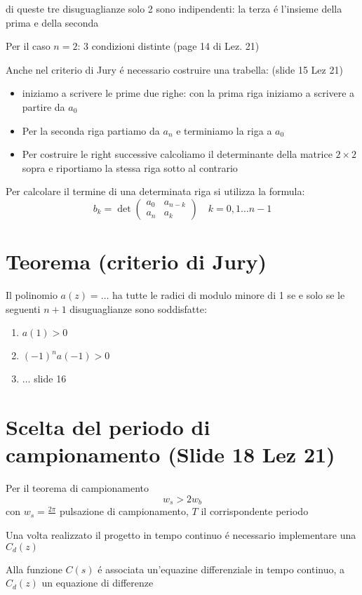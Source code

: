 \documentclass{article}
\begin{document}
di queste tre disuguaglianze solo 2 sono indipendenti: la terza \'e l'insieme della prima e della seconda

Per il caso $n = 2$: 3 condizioni distinte (page 14 di Lez. 21)


\bigbreak
Anche nel criterio di Jury \'e necessario costruire una trabella: (slide 15 Lez 21)
\begin{itemize}
    \item iniziamo a scrivere le prime due righe: con la prima riga iniziamo a scrivere a partire da $a_0$
    \item Per la seconda riga partiamo da $a_n$ e terminiamo la riga a $a_0$
    \item Per costruire le right successive calcoliamo il determinante della matrice $2\times 2$ sopra e riportiamo la stessa riga sotto al contrario
\end{itemize}

Per calcolare il termine di una determinata riga si utilizza la formula:
\[
    b_k = \det\begin{pmatrix}
        a_0 & a_{n-k}\\
        a_n & a_k
    \end{pmatrix} \quad k = 0,1\ldots n-1
\]

\section{Teorema (criterio di Jury)}
Il polinomio $a(z) = \ldots$ ha tutte le radici di modulo minore di 1 se e solo se le seguenti $n+1$ disuguaglianze sono soddisfatte:
\begin{enumerate}
    \item $a(1) > 0$
    \item $(-1)^n a(-1) > 0$
    \item $\ldots$ slide 16
\end{enumerate}

\section{Scelta del periodo di campionamento (Slide 18 Lez 21)}

Per il teorema di campionamento
\[ w_s > 2w_b \]
con $w_s = \frac{2\pi}{}$ pulsazione di campionamento, $T$ il corrispondente periodo

Una volta realizzato il progetto in tempo continuo \'e necessario implementare una $C_d(z)$

Alla funzione $C(s)$ \'e associata un'equazine differenziale in tempo continuo, a $C_d(z)$  un equazione di differenze
\end{document}
